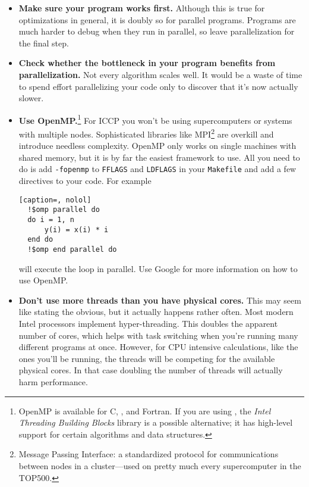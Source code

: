 \begin{itemize}
  \item\textbf{Make sure your program works first.} Although this is true for optimizations in general, it is doubly so for parallel programs.
    Programs are much harder to debug when they run in parallel, so leave parallelization for the final step.
  \item\textbf{Check whether the bottleneck in your program benefits from parallelization.} Not every algorithm scales well.
    It would be a waste of time to spend effort parallelizing your code only to discover that it's now actually slower.
  \item\textbf{Use OpenMP.}\footnote{OpenMP is available for C, \Cplusplus, and Fortran.
    If you are using \Cplusplus, the \emph{Intel Threading Building Blocks} library is a possible alternative; it has high-level support for certain algorithms and data structures.} For ICCP you won't be using supercomputers or systems with multiple nodes.
    Sophisticated libraries like MPI\footnote{Message Passing Interface: a standardized protocol for communications between nodes in a cluster---used on pretty much every supercomputer in the TOP500.} are overkill and introduce needless complexity.
    OpenMP only works on single machines with shared memory, but it is by far the easiest framework to use.
    All you need to do is add \texttt{-fopenmp} to \texttt{FFLAGS} and \texttt{LDFLAGS} in your \texttt{Makefile} and add a few directives to your code.
    For example
\begin{lstlisting}[caption=, nolol]
  !$omp parallel do
  do i = 1, n
      y(i) = x(i) * i
  end do
  !$omp end parallel do
\end{lstlisting}
    will execute the loop in parallel. Use Google for more information on how to use OpenMP.
  \item\textbf{Don't use more threads than you have physical cores.} This may seem like stating the obvious, but it actually happens rather often.
  Most modern Intel processors implement hyper-threading.
  This doubles the apparent number of cores, which helps with task switching when you're running many different programs at once.
  However, for CPU intensive calculations, like the ones you'll be running, the threads will be competing for the available physical cores.
  In that case doubling the number of threads will actually harm performance.
\end{itemize}

